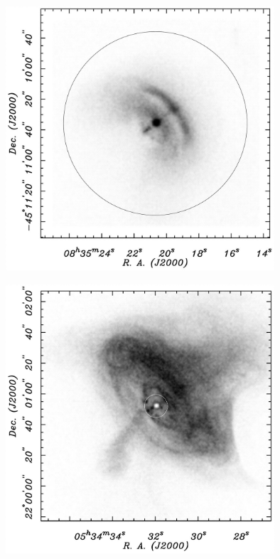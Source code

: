 \begin{minipage}[t]{10cm}
  \begin{center}
    \includegraphics[width=10cm,height=!]{./E/fg3a_helfand.jpg}
    \end{center}
\end{minipage}
\begin{minipage}[t]{15cm}
  \begin{center}
    \includegraphics[width=10cm,height=!]{./E/fg3b_helfand.jpg}
    \end{center}
\end{minipage}

